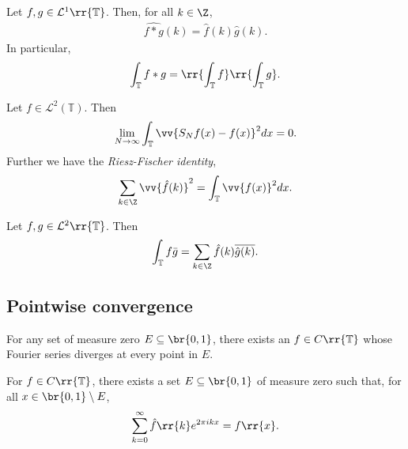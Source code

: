 \documentclass{article}
\begin{document}
\begin{proposition}
  Let $f,g\in\mathcal L^1\rr{\mathbb T}$. Then, for all $k\in\Z$,
  \begin{align*}
    \widehat{f*g}(k) = \hat f(k)\hat g(k).
  \end{align*}
  In particular,
  \begin{align*}
    \int_{\mathbb T}f*g = \rr{\int_{\mathbb T} f}\rr{\int_{\mathbb T}g}.
  \end{align*}
\end{proposition}

\begin{theorem}
  Let $f\in\mathcal L^2(\mathbb T)$. Then
  \begin{align*}
    \lim_{N\to\infty}\int_{\mathbb T}\vv{S_N f(x)-f(x)}^2 dx = 0.
  \end{align*}
  Further we have the \emph{Riesz-Fischer identity},
  \begin{align*}
    \sum_{k\in\Z} \vv{\hat f(k)}^2 = \int_{\mathbb T} \vv{f(x)}^2dx.
  \end{align*}
\end{theorem}

\begin{corollary}[Parseval]
  Let $f,g\in\mathcal L^2\rr{\mathbb T}$. Then
  \begin{align*}
    \int_{\mathbb T}f\bar g = \sum_{k\in\Z} \hat f(k)\overline{\hat g(k)}.
  \end{align*}
\end{corollary}

\subsection{Pointwise convergence}

\begin{theorem}[Katznelson]
  For any set of measure zero $E\subseteq\br{0,1}$, there exists an $f\in C\rr{\mathbb T}$
  whose Fourier series diverges at every point in $E$.
\end{theorem}

\begin{theorem}[Carleson]
  For $f\in C\rr{\mathbb T}$, there exists a set $E\subseteq\br{0,1}$ of measure zero
  such that, for all $x\in \br{0,1}\setminus E$,
  \begin{align*}
    \sum_{k=0}^\infty \hat f\rr{k}e^{2\pi i k x} = f\rr{x}.
  \end{align*}
\end{theorem}
\end{document}
